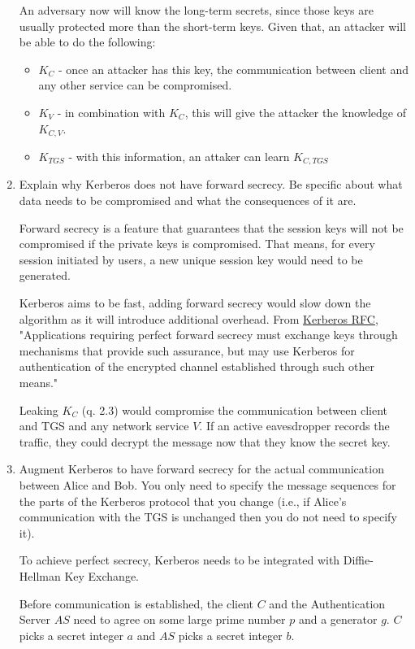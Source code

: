\documentclass[11pt]{article}
\begin{document}
\begin{enumerate}
    An adversary now will know the long-term secrets, since those keys are usually protected more than the short-term keys. Given that, an attacker will be able to do the following:

    \begin{itemize}
      \item $K_{C}$ - once an attacker has this key, the communication between client and any other service can be compromised.
      \item $K_{V}$ - in combination with $K_{C}$, this will give the attacker the knowledge of $K_{C, V}$.
      \item $K_{TGS}$ - with this information, an attaker can learn $K_{C, TGS}$
    \end{itemize}

    \item  Explain why Kerberos does not have forward secrecy. Be specific about what data needs to be compromised and what the consequences of it are.

    Forward secrecy is a feature that guarantees that the session keys will not be compromised if the private keys is compromised. That means, for every session initiated by users, a new unique session key would need to be generated.

    Kerberos aims to be fast, adding forward secrecy would slow down the algorithm as it will introduce additional overhead. From \href{https://tools.ietf.org/html/rfc4120}{Kerberos RFC}, "Applications requiring perfect forward secrecy must exchange keys through mechanisms that provide such assurance, but may use Kerberos for authentication of the encrypted channel established through such other means."

    Leaking $K_{C}$ (q. 2.3) would compromise the communication between client and TGS and any network service $V$. If an active eavesdropper records the traffic, they could decrypt the message now that they know the secret key.

    \item Augment Kerberos to have forward secrecy for the actual communication between Alice and Bob. You only need to specify the message sequences for the parts of the Kerberos protocol that you change (i.e., if Alice’s communication with the TGS is unchanged then you do not need to specify it).

    To achieve perfect secrecy, Kerberos needs to be integrated with Diffie-Hellman Key Exchange.
    
    Before communication is established, the client $C$ and the Authentication Server $AS$ need to agree on some large prime number $p$ and a generator $g$. $C$ picks a secret integer $a$ and $AS$ picks a secret integer $b$.  


\end{enumerate}
\end{document}
